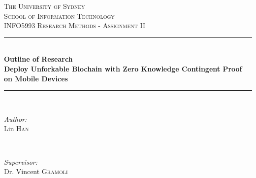 \begin{titlepage}

\newcommand{\HRule}{\rule{\linewidth}{0.5mm}} %

\center %
 

\textsc{\LARGE The University of Sydney}\\[1.5cm] %
\textsc{\Large School of Information Technology}\\[0.5cm] %
\textsc{\large INFO5993 Research Methods - Assignment II}\\[0.5cm] %


\HRule \\[0.4cm]
{ \huge \bfseries Outline of Research \\
 Deploy Unforkable Blochain with Zero Knowledge Contingent Proof on Mobile Devices}\\[0.4cm] %
\HRule \\[1.5cm]
 

\begin{minipage}{0.4\textwidth}
\begin{flushleft} \large
\emph{Author:}\\
Lin \textsc{Han} %
\end{flushleft}
\end{minipage}
~
\begin{minipage}{0.4\textwidth}
\begin{flushright} \large
\emph{Supervisor:} \\
Dr. Vincent \textsc{Gramoli} %
\end{flushright}
\end{minipage}\\[2cm]


\end{titlepage}
